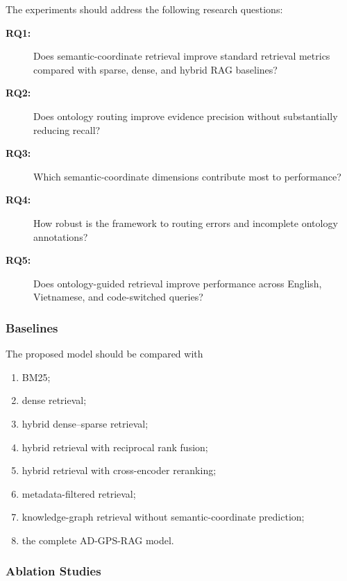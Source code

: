 \documentclass{article}
\begin{document}
The experiments should address the following research questions:
\begin{description}
    \item[\textbf{RQ1:}]
    Does semantic-coordinate retrieval improve standard retrieval metrics compared with sparse, dense, and hybrid RAG baselines?

    \item[\textbf{RQ2:}]
    Does ontology routing improve evidence precision without substantially reducing recall?

    \item[\textbf{RQ3:}]
    Which semantic-coordinate dimensions contribute most to performance?

    \item[\textbf{RQ4:}]
    How robust is the framework to routing errors and incomplete ontology annotations?

    \item[\textbf{RQ5:}]
    Does ontology-guided retrieval improve performance across English, Vietnamese, and code-switched queries?
\end{description}

\subsubsection{Baselines}

The proposed model should be compared with
\begin{enumerate}
    \item BM25;
    \item dense retrieval;
    \item hybrid dense--sparse retrieval;
    \item hybrid retrieval with reciprocal rank fusion;
    \item hybrid retrieval with cross-encoder reranking;
    \item metadata-filtered retrieval;
    \item knowledge-graph retrieval without semantic-coordinate prediction;
    \item the complete AD-GPS-RAG model.
\end{enumerate}

\subsubsection{Ablation Studies}
\end{document}
